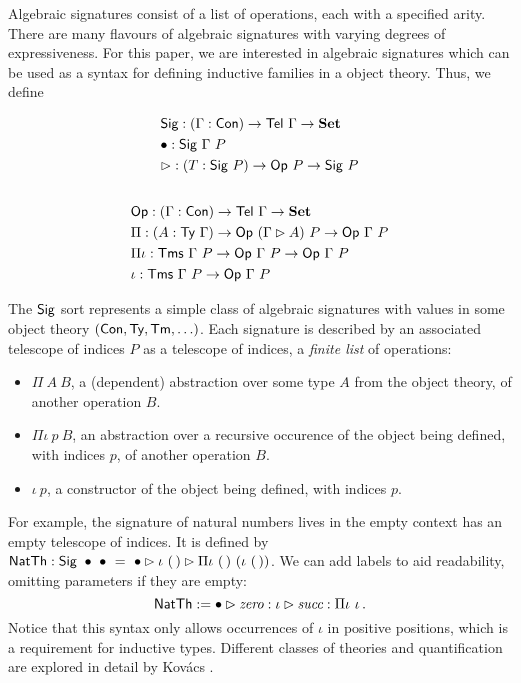 Algebraic signatures \cite{Adamek2010-ls,Kovacs2023-gq} consist of a list of operations, each with a specified
arity. There are many flavours of algebraic signatures with varying degrees of
expressiveness. For this paper, we are interested in algebraic signatures which can
be used as a syntax for defining inductive families in a object theory. Thus, we define%
\\[0em]
\begin{minipage}[t]{0.4\linewidth}
\begin{align*}
&\textsf{Sig} : (\Gamma : \textsf{Con}) \to \textsf{Tel}\ \Gamma \to \mathbf{Set} \\
&\bullet : \textsf{Sig}\ \Gamma\ P \\
&\rhd : (T : \textsf{Sig}\ P) \to \textsf{Op}\ P \to \textsf{Sig}\ P \\[1em]
\end{align*}
\end{minipage}%
\begin{minipage}[t]{0.6\textwidth}
\begin{align*}
&\mta{Op} : (\Gamma : \Con) \to \mta{Tel}\ \Gamma \to \Set \\
&\Pi : (A : \Ty\ \Gamma) \to \mta{Op}\ (\Gamma \rhd A)\ P \to \mta{Op}\ \Gamma\ P \\
&\Pi\iota : \Tms\ \Gamma\ P \to \mta{Op}\ \Gamma\ P \to \mta{Op}\ \Gamma\ P \\
&\iota : \Tms\ \Gamma\ P \to \mta{Op}\ \Gamma\ P
\end{align*}
\end{minipage}
The $\textsf{Sig}$ sort represents a simple class of algebraic signatures with
values in some object theory $(\textsf{Con}, \textsf{Ty}, \textsf{Tm}, \ldots)$. Each
signature is described by an associated telescope of indices $P$ as a telescope
of indices, a \emph{finite list} of operations: \begin{itemize}
    \item $\Pi\ A\ B$, a (dependent) abstraction over some type $A$ from the
    object theory, of another operation $B$. \item $\Pi\iota\ p\ B$, an
    abstraction over a recursive occurence of
    the object being defined, with indices $p$, of another operation
    $B$.
    \item $\iota\ p$, a constructor of the object being defined, with indices $p$.
\end{itemize}
For example, the signature of natural numbers lives in the empty context has an
empty telescope of indices. It is defined by $\mta{NatTh} : \mta{Sig}\
\bullet\ \bullet\ =\ \bullet \rhd \iota\ (\,) \rhd \Pi\iota\ (\,)\ (\iota\
(\,))$. We can add labels to aid readability, omitting parameters if they are empty:
\[
\textsf{NatTh} := \bullet \rhd \textit{zero} : \iota \rhd \textit{succ} : \Pi\iota\ \iota \,.
\]
Notice that this syntax only allows occurrences of $\iota$ in positive
positions, which is a requirement for inductive types.
Different classes of theories and quantification are explored in detail by
Kov\'acs \cite{Kovacs2023-gq}.

